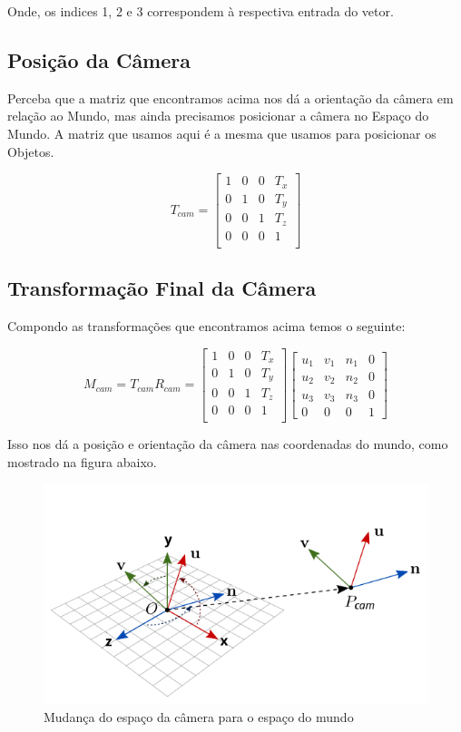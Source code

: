 \documentclass[12pt]{article}
\begin{document}
\noindent
Onde, os indices 1, 2 e 3 correspondem à respectiva entrada do vetor.
    
\subsection{Posição da Câmera}

Perceba que a matriz que encontramos acima nos dá a orientação da câmera em relação ao Mundo, mas ainda precisamos posicionar a câmera no Espaço do Mundo. A matriz que usamos aqui é a mesma que usamos para posicionar os Objetos.

\[
T_{cam} =
\begin{bmatrix}
    1 & 0 & 0 & T_{x} \\
    0 & 1 & 0 & T_{y} \\
    0 & 0 & 1 & T_{z} \\
    0 & 0 & 0 & 1 \\
\end{bmatrix}
\]

\subsection{Transformação Final da Câmera}

Compondo as transformações que encontramos acima temos o seguinte:

\[
M_{cam} = T_{cam} R_{cam} = 
\begin{bmatrix}
    1 & 0 & 0 & T_{x} \\
    0 & 1 & 0 & T_{y} \\
    0 & 0 & 1 & T_{z} \\
    0 & 0 & 0 & 1 \\
\end{bmatrix}
\begin{bmatrix}
    u_1 & v_1 & n_1 & 0   \\
    u_2 & v_2 & n_2 & 0   \\    
    u_3 & v_3 & n_3 & 0   \\
    0 & 0 & 0 & 1
\end{bmatrix}
\]

\noindent
Isso nos dá a posição e orientação da câmera nas coordenadas do mundo, como mostrado na figura abaixo.

\begin{figure}[H]
    \centering
    \includegraphics[width=0.6\linewidth]{imgs/07_lookat7.png}
    \caption{Mudança do espaço da câmera para o espaço do mundo}
\end{figure}
\end{document}
